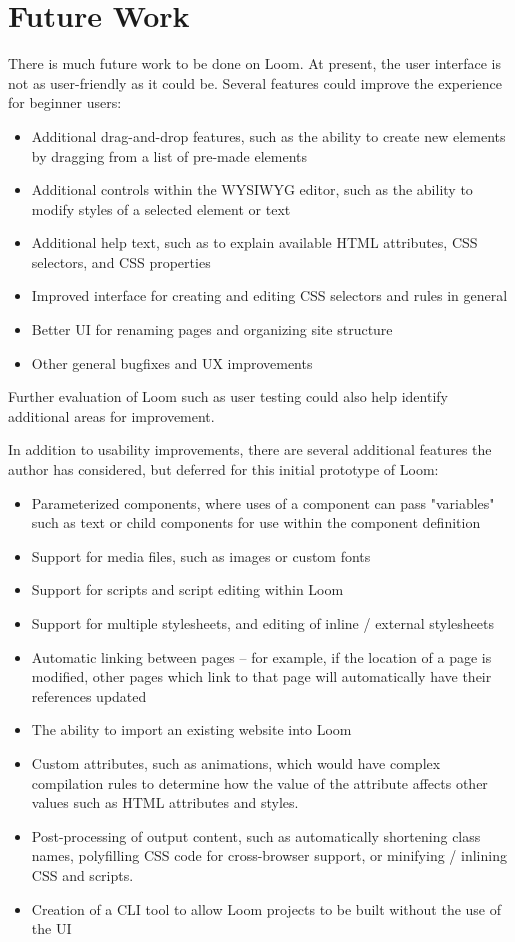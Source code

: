 \documentclass[conference, letterpaper]{IEEEtran}
\begin{document}
\section{Future Work}
There is much future work to be done on Loom. At present, the user interface is not as user-friendly as it could be. Several features could improve the experience for beginner users:
\begin{itemize}
  \item Additional drag-and-drop features, such as the ability to create new elements by dragging from a list of pre-made elements
  \item Additional controls within the WYSIWYG editor, such as the ability to modify styles of a selected element or text
  \item Additional help text, such as to explain available HTML attributes, CSS selectors, and CSS properties
  \item Improved interface for creating and editing CSS selectors and rules in general
  \item Better UI for renaming pages and organizing site structure
  \item Other general bugfixes and UX improvements
\end{itemize}
Further evaluation of Loom such as user testing could also help identify additional areas for improvement.

\medskip

In addition to usability improvements, there are several additional features the author has considered, but deferred for this initial prototype of Loom:
\begin{itemize}
  \item Parameterized components, where uses of a component can pass "variables" such as text or child components for use within the component definition
  \item Support for media files, such as images or custom fonts
  \item Support for scripts and script editing within Loom
  \item Support for multiple stylesheets, and editing of inline / external stylesheets
  \item Automatic linking between pages -- for example, if the location of a page is modified, other pages which link to that page will automatically have their references updated
  \item The ability to import an existing website into Loom
  \item Custom attributes, such as animations, which would have complex compilation rules to determine how the value of the attribute affects other values such as HTML attributes and styles.
  \item Post-processing of output content, such as automatically shortening class names, polyfilling CSS code for cross-browser support, or minifying / inlining CSS and scripts.
  \item Creation of a CLI tool to allow Loom projects to be built without the use of the UI
\end{itemize}
\end{document}
